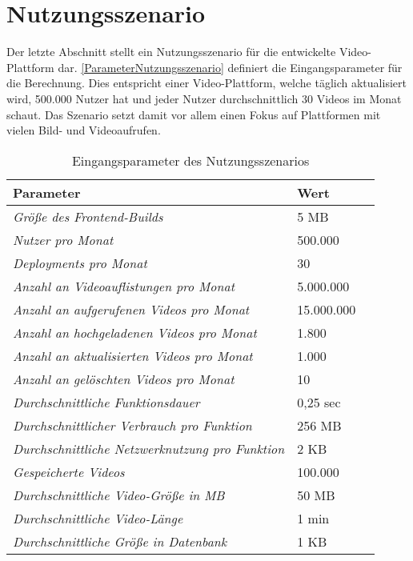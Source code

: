 \section{Nutzungsszenario}

Der letzte Abschnitt stellt ein Nutzungsszenario für die entwickelte Video-Plattform dar. \autoref{ParameterNutzungsszenario} definiert die Eingangsparameter für die Berechnung. Dies entspricht einer Video-Plattform, welche täglich aktualisiert wird,  500.000 Nutzer hat und jeder Nutzer durchschnittlich 30 Videos im Monat schaut. Das Szenario setzt damit vor allem einen Fokus auf Plattformen mit vielen Bild- und Videoaufrufen.

\begin{table}[h]
  \caption{Eingangsparameter des Nutzungsszenarios}
  \label{ParameterNutzungsszenario}
  \renewcommand{\arraystretch}{1.2}
  \centering
  \sffamily
  \begin{footnotesize}
    \begin{tabularx}{0.9\textwidth}{l l l}
      \toprule
      \textbf{Parameter} & \textbf{Wert}\\
      \midrule
      \emph{Größe des Frontend-Builds} & 5 MB \\
      \emph{Nutzer pro Monat} & 500.000 \\
      \emph{Deployments pro Monat } & 30 \\
      \emph{Anzahl an Videoauflistungen pro Monat} & 5.000.000 \\
      \emph{Anzahl an aufgerufenen Videos pro Monat} & 15.000.000 \\
      \emph{Anzahl an hochgeladenen Videos pro Monat} & 1.800 \\
      \emph{Anzahl an aktualisierten Videos pro Monat} & 1.000 \\
      \emph{Anzahl an gelöschten Videos pro Monat} & 10 \\
      \emph{Durchschnittliche Funktionsdauer} & 0,25 sec \\
      \emph{Durchschnittlicher Verbrauch pro Funktion} & 256 MB \\
      \emph{Durchschnittliche Netzwerknutzung pro Funktion} & 2 KB \\
      \emph{Gespeicherte Videos} & 100.000 \\
      \emph{Durchschnittliche Video-Größe in MB} & 50 MB \\
      \emph{Durchschnittliche Video-Länge} & 1 min \\
      \emph{Durchschnittliche Größe in Datenbank} & 1 KB \\
      \bottomrule
    \end{tabularx}
  \end{footnotesize}
  \rmfamily
\end{table}

